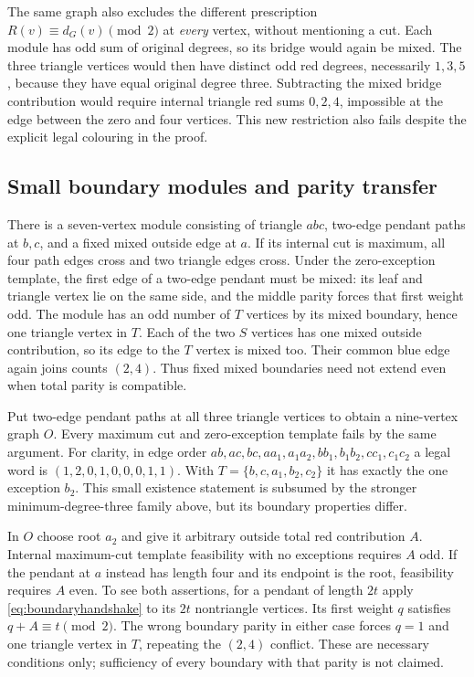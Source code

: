 The same graph also excludes the different prescription
$R(v)\equiv d_G(v)\pmod2$ at \emph{every} vertex, without mentioning
a cut. Each module has odd sum of original degrees, so its bridge
would again be mixed. The three triangle vertices would then have
distinct odd red degrees, necessarily $1,3,5$, because they have
equal original degree three. Subtracting the mixed bridge contribution
would require internal triangle red sums $0,2,4$, impossible at the
edge between the zero and four vertices. This new restriction also
fails despite the explicit legal colouring in the proof.

\subsection{Small boundary modules and parity transfer}

There is a seven-vertex module consisting of triangle $abc$,
two-edge pendant paths at $b,c$, and a fixed mixed outside edge
at $a$. If its internal cut is maximum, all four path edges cross
and two triangle edges cross. Under the zero-exception template,
the first edge of a two-edge pendant must be mixed: its leaf and
triangle vertex lie on the same side, and the middle parity forces
that first weight odd. The module has an odd number of $T$ vertices
by its mixed boundary, hence one triangle vertex in $T$. Each of
the two $S$ vertices has one mixed outside contribution, so its
edge to the $T$ vertex is mixed too. Their common blue edge again
joins counts $(2,4)$. Thus fixed mixed boundaries need not extend
even when total parity is compatible.

Put two-edge pendant paths at all three triangle vertices to obtain
a nine-vertex graph $O$. Every maximum cut and zero-exception
template fails by the same argument. For clarity, in edge order
$ab,ac,bc,aa_1,a_1a_2,bb_1,b_1b_2,cc_1,c_1c_2$ a legal word is
$(1,2,0,1,0,0,0,1,1)$. With
$T=\{b,c,a_1,b_2,c_2\}$ it has exactly the one exception $b_2$.
This small existence statement is subsumed by the stronger
minimum-degree-three family above, but its boundary properties differ.

In $O$ choose root $a_2$ and give it arbitrary outside total red
contribution $A$. Internal maximum-cut template feasibility with no
exceptions requires $A$ odd. If the pendant at $a$ instead has
length four and its endpoint is the root, feasibility requires $A$
even. To see both assertions, for a pendant of length $2t$ apply
\eqref{eq:boundaryhandshake} to its $2t$ nontriangle vertices.
Its first weight $q$ satisfies $q+A\equiv t\pmod2$. The wrong
boundary parity in either case forces $q=1$ and one triangle vertex
in $T$, repeating the $(2,4)$ conflict. These are necessary
conditions only; sufficiency of every boundary with that parity is
not claimed.

